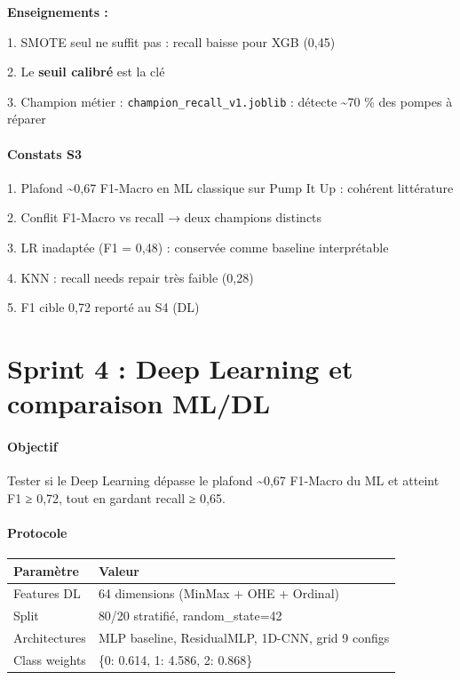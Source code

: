 \documentclass[11pt,a4paper]{report}
\begin{document}
\textbf{Enseignements :}



1. SMOTE seul ne suffit pas : recall baisse pour XGB (0,45)

2. Le \textbf{seuil calibré} est la clé

3. Champion métier : \texttt{champion\_recall\_v1.joblib} : détecte \textasciitilde{}70 \% des pompes à réparer



\subsubsection{Constats S3}



1. Plafond \textasciitilde{}0,67 F1-Macro en ML classique sur Pump It Up : cohérent littérature

2. Conflit F1-Macro vs recall → deux champions distincts

3. LR inadaptée (F1 = 0,48) : conservée comme baseline interprétable

4. KNN : recall needs repair très faible (0,28)

5. F1 cible 0,72 reporté au S4 (DL)





\chapter{Sprint 4 : Deep Learning et comparaison ML/DL}



\subsubsection{Objectif}



Tester si le Deep Learning dépasse le plafond \textasciitilde{}0,67 F1-Macro du ML et atteint F1 ≥ 0,72, tout en gardant recall ≥ 0,65.



\subsubsection{Protocole}



\begin{longtable}{@{}ll@{}}
\toprule
Paramètre & Valeur \\
\midrule
Features DL & 64 dimensions (MinMax + OHE + Ordinal) \\
Split & 80/20 stratifié, random\_state=42 \\
Architectures & MLP baseline, ResidualMLP, 1D-CNN, grid 9 configs \\
Class weights & \{0: 0.614, 1: 4.586, 2: 0.868\} \\
\bottomrule
\end{longtable}
\end{document}
